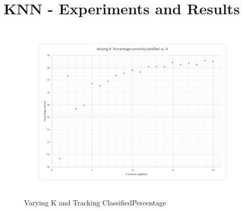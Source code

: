 \documentclass{article}
\begin{document}
\section{KNN - Experiments and Results}
\begin{figure}[!htbp]
\begin{center}
\includegraphics[width=1.0\textwidth]{varyingkKNN} %
\caption{Varying K and Tracking ClassifiedPercentage}
\end{center}
\end{figure}
\end{document}
